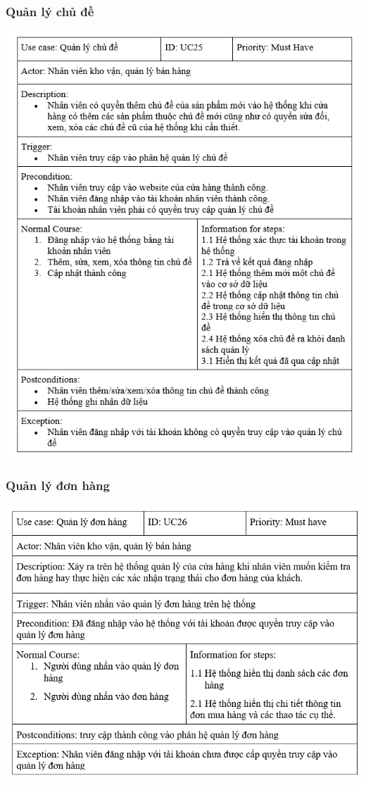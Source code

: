 \documentclass[12pt,a4paper,2sides]{report}
\begin{document}
\subsubsection{Quản lý chủ đề}
    \includegraphics[width=1\linewidth]{lib/usecase/quanlychude.png}\\\vspace*{1cm}    
\subsubsection{Quản lý đơn hàng}
    \includegraphics[width=1\linewidth]{lib/usecase/quanlydonhang.png}\\\vspace*{1cm}    
\end{document}
